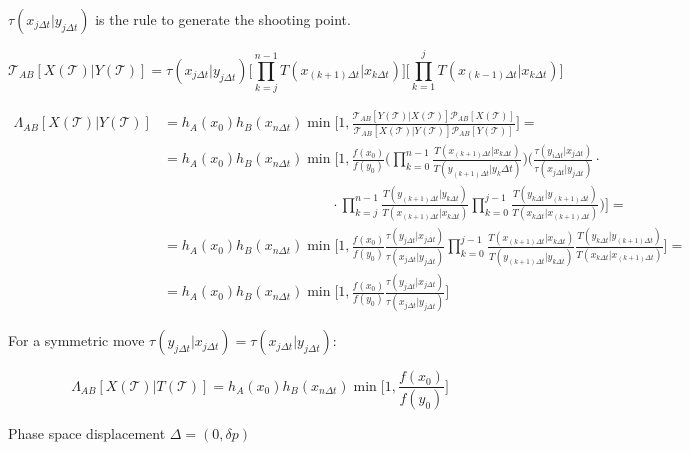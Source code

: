 	$\tau(x_{j\Delta t}|y_{j\Delta t})$ is the rule to generate the shooting point.

	$$\mathcal{T}_{AB}[X(\mathcal{T})|Y(\mathcal{T})] = \tau(x_{j\Delta t}|y_{j\Delta t})\biggl[\prod\limits_{k=j}^{n-1}T(x_{(k+1)\Delta t}|x_{k\Delta t})\biggr]\biggl[\prod\limits_{k=1}^jT(x_{(k-1)\Delta t}|x_{k\Delta t})\biggr]$$

	\begin{align*}
		\Lambda_{AB}[X(\mathcal{T})|Y(\mathcal{T})] &= h_A(x_0)h_B(x_{n\Delta t})\min\biggl[1, \frac{\mathcal{T}_{AB}[Y(\mathcal{T})|X(\mathcal{T})]\mathcal{P}_{AB}[X(\mathcal{T})]}{\mathcal{T}_{AB}[X(\mathcal{T})|Y(\mathcal{T})]\mathcal{P}_{AB}[Y(\mathcal{T})]}\biggr] = \\
																								&= h_A(x_0)h_B(x_{n\Delta t})\min\biggl[1, \frac{f(x_0)}{f(y_0)}\biggl(\prod\limits_{k=0}^{n-1}\frac{T(x_{(k+1)\Delta t}|x_{k\Delta t})}{T(y_{(k+1)\Delta t}|y_k\Delta t)}\biggr)\biggl(\frac{\tau(y_{i\Delta t}|x_{j\Delta t})}{\tau(x_{j\Delta t}|y_{j\Delta t})}\cdot\\
																								&\qquad\qquad\qquad\qquad\qquad\qquad\cdot\prod\limits_{k=j}^{n-1}\frac{T(y_{(k+1)\Delta t}|y_{k\Delta t})}{T(x_{(k+1)\Delta t}|x_{k\Delta t})}\prod\limits_{k=0}^{j-1}\frac{T(y_{k\Delta t}|y_{(k+1)\Delta t})}{T(x_{k\Delta t}|x_{(k+1)\Delta t})}\biggr)\biggr] = \\
																								&=h_A(x_0)h_B(x_{n\Delta t})\min\biggl[1, \frac{f(x_0)}{f(y_0)}\frac{\tau(y_{j\Delta t}|x_{j\Delta t})}{\tau(x_{j\Delta t}|y_{j\Delta t})}\prod\limits_{k=0}^{j-1}\frac{T(x_{(k+1)\Delta t}|x_{k\Delta t})}{T(y_{(k+1)\Delta t}|y_{k\Delta t})}\frac{T(y_{k\Delta t}|y_{(k+1)\Delta t})}{T(x_{k\Delta t}|x_{(k+1)\Delta t})}\biggr]=\\
																								& = h_A(x_0)h_B(x_{n\Delta t})\min\biggl[1, \frac{f(x_0)}{f(y_0)}\frac{\tau(y_{j\Delta t}|x_{j\Delta t})}{\tau(x_{j\Delta t}|y_{j\Delta t})}\biggr]
	\end{align*}

	For a symmetric move $\tau(y_{j\Delta t}|x_{j\Delta t}) = \tau(x_{j\Delta t}|y_{j\Delta t})$:

	$$\Lambda_{AB}[X(\mathcal{T})|T(\mathcal{T})] = h_A(x_0)h_B(x_{n\Delta t})\min\biggl[1, \frac{f(x_0)}{f(y_0)}\biggr]$$

	Phase space displacement $\Delta = (0, \delta p)$

